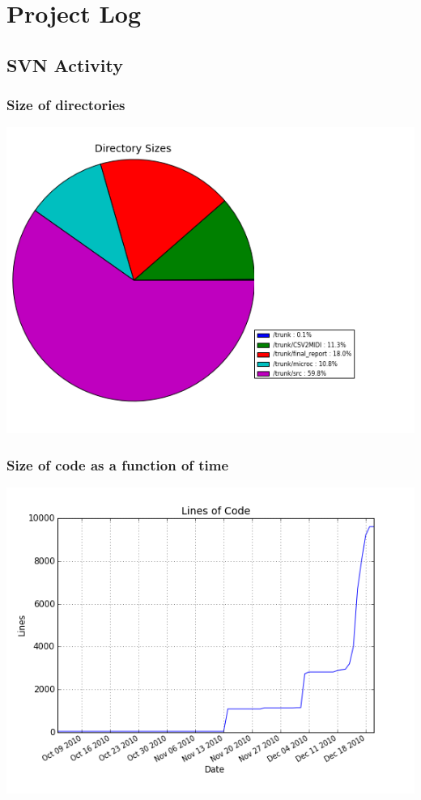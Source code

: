 \documentclass[12pt,A4]{book}
\begin{document}
\section{Project Log}
\subsection{SVN Activity}
\subsubsection{Size of directories}
\includegraphics[width=.8\textwidth]{svngraphs/dirsizepie.png}
\subsubsection{Size of code as a function of time}
\includegraphics[width=.8\textwidth]{svngraphs/loc.png}
\end{document}
